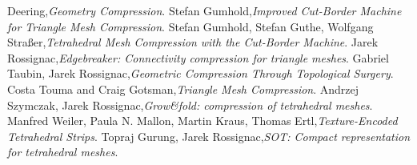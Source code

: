 \documentclass[a4paper,11pt,openany]{article}
\begin{document}
\begin{thebibliography}{999}
Deering,\emph{Geometry Compression}. 
Stefan Gumhold,\emph{Improved Cut-Border Machine for Triangle Mesh Compression}. 
Stefan Gumhold, Stefan Guthe, Wolfgang Straßer,\emph{Tetrahedral Mesh Compression with the Cut-Border Machine}. 
Jarek Rossignac,\emph{Edgebreaker: Connectivity compression for triangle meshes}. 
Gabriel Taubin, Jarek Rossignac,\emph{Geometric Compression Through Topological Surgery}. 
Costa Touma and Craig Gotsman,\emph{Triangle Mesh Compression}. 
Andrzej Szymczak, Jarek Rossignac,\emph{Grow\&fold: compression of tetrahedral meshes}. 
Manfred Weiler, Paula N. Mallon, Martin Kraus, Thomas Ertl,\emph{Texture-Encoded Tetrahedral Strips}. 
Topraj Gurung, Jarek Rossignac,\emph{SOT: Compact representation for tetrahedral meshes}. 





\end{thebibliography}
\end{document}
